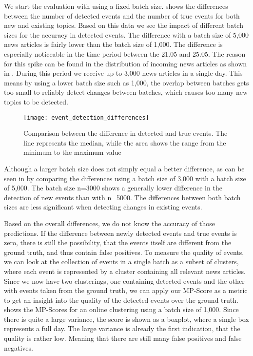 We start the evaluation with using a fixed batch size.
 shows the differences between the number of detected events
and the number of true events for both new and existing topics.
Based on this data we see the impact of different batch sizes for the accuracy in detected events.
The difference with a batch size of 5,000 news articles is fairly lower than the batch size of 1,000.
The difference is especially noticeable in the time period between the 21.05 and 25.05.
The reason for this spike can be found in the distribution of incoming news articles
as shown in .
During this period we receive up to 3,000 news articles in a single day.
This means by using a lower batch size such as 1,000,
the overlap between batches gets too small to reliably detect changes between batches,
which causes too many new topics to be detected.

\begin{figure}[h]
    \centering
    \texttt{[image: event\_detection\_differences]}
    \caption{
        Comparison between the difference in detected and true events.
        The line represents the median, while the area shows the range from the minimum to the maximum value
    }
    \label{fig:event_detection_differences}
\end{figure}

Although a larger batch size does not simply equal a better difference,
as can be seen in 
by comparing the differences using a batch size of 3,000 with a batch size of 5,000.
The batch size n=3000 shows a generally lower difference in the detection of new events than with n=5000.
The differences between both batch sizes are less significant when detecting changes in existing events.

Based on the overall differences, we do not know the accuracy of those predictions.
If the difference between newly detected events and true events is zero,
there is still the possibility, that the events itself are different from the ground truth,
and thus contain false positives.
To measure the quality of events, we can look at the collection of events in a single batch as a subset of clusters,
where each event is represented by a cluster containing all relevant news articles.
Since we now have two clusterings, one containing detected events and the other with events taken from the ground truth,
we can apply our MP-Score as a metric to get an insight into the quality of the detected events over the ground truth.
 shows the MP-Scores for an online clustering using a batch size of 1,000.
Since there is quite a large variance, the score is shown as a boxplot, where a single box represents a full day.
The large variance is already the first indication, that the quality is rather low.
Meaning that there are still many false positives and false negatives.

